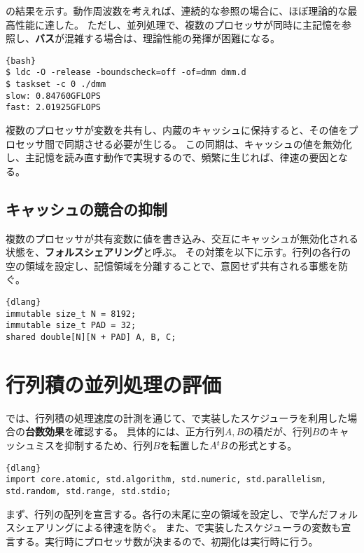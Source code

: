 \documentclass[10pt,a4paper]{book}
\begin{document}
\CPU{}の結果を示す。動作周波数を考えれば、連続的な参照の場合に、ほぼ理論的な最高性能に達した。
ただし、並列処理で、複数のプロセッサが同時に主記憶を参照し、\textbf{バス}が混雑する場合は、理論性能の発揮が困難になる。

\begin{Verbatim}{bash}
$ ldc -O -release -boundscheck=off -of=dmm dmm.d
$ taskset -c 0 ./dmm
slow: 0.84760GFLOPS
fast: 2.01925GFLOPS
\end{Verbatim}

複数のプロセッサが変数を共有し、内蔵のキャッシュに保持すると、その値をプロセッサ間で同期させる必要が生じる。
この同期は、キャッシュの値を無効化し、主記憶を読み直す動作で実現するので、頻繁に生じれば、律速の要因となる。

\section{キャッシュの競合の抑制}

複数のプロセッサが共有変数に値を書き込み、交互にキャッシュが無効化される状態を、\textbf{フォルスシェアリング}と呼ぶ。
その対策を以下に示す。行列の各行の空の領域を設定し、記憶領域を分離することで、意図せず共有される事態を防ぐ。

\begin{Verbatim}{dlang}
immutable size_t N = 8192;
immutable size_t PAD = 32;
shared double[N][N + PAD] A, B, C;
\end{Verbatim}

\chapter{行列積の並列処理の評価\label{chap:dmm}}

では、行列積の処理速度の計測を通じて、で実装したスケジューラを利用した場合の\textbf{台数効果}を確認する。
具体的には、正方行列$A,B$の積だが、行列$B$のキャッシュミスを抑制するため、行列$B$を転置した$A{}^tB$の形式とする。

\begin{Verbatim}{dlang}
import core.atomic, std.algorithm, std.numeric, std.parallelism, std.random, std.range, std.stdio;
\end{Verbatim}

まず、行列の配列を宣言する。各行の末尾に空の領域を設定し、で学んだフォルスシェアリングによる律速を防ぐ。
また、で実装したスケジューラの変数も宣言する。実行時にプロセッサ数が決まるので、初期化は実行時に行う。
\end{document}
